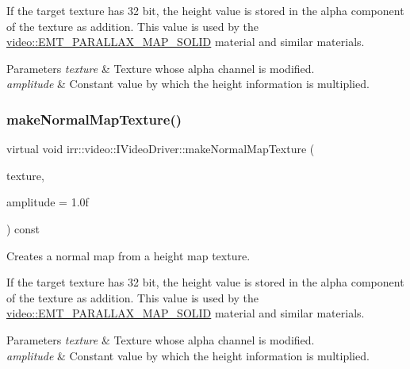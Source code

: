 If the target texture has 32 bit, the height value is stored in the alpha component of the texture as addition. This value is used by the \hyperlink{namespaceirr_1_1video_ac8e9b6c66f7cebabd1a6d30cbc5430f1a934021cc4ff72a7ac1a66f392b9abb82}{video\+::\+E\+M\+T\+\_\+\+P\+A\+R\+A\+L\+L\+A\+X\+\_\+\+M\+A\+P\+\_\+\+S\+O\+L\+ID} material and similar materials. 
\begin{DoxyParams}{Parameters}
{\em texture} & Texture whose alpha channel is modified. \\
\hline
{\em amplitude} & Constant value by which the height information is multiplied. \\
\hline
\end{DoxyParams}
\mbox{\label{classirr_1_1video_1_1IVideoDriver_a6470e31c1aaf2c0fa5e5a5b3f8f092e0}} 
\subsubsection{\texorpdfstring{make\+Normal\+Map\+Texture()}{makeNormalMapTexture()}\hspace{0.1cm}{\footnotesize\ttfamily [2/2]}}
{\footnotesize\ttfamily virtual void irr\+::video\+::\+I\+Video\+Driver\+::make\+Normal\+Map\+Texture (\begin{DoxyParamCaption}\item[{\hyperlink{classirr_1_1video_1_1ITexture}{video\+::\+I\+Texture} $\ast$}]{texture,  }\item[{\hyperlink{namespaceirr_a0277be98d67dc26ff93b1a6a1d086b07}{f32}}]{amplitude = {\ttfamily 1.0f} }\end{DoxyParamCaption}) const\hspace{0.3cm}{\ttfamily [pure virtual]}}



Creates a normal map from a height map texture. 

If the target texture has 32 bit, the height value is stored in the alpha component of the texture as addition. This value is used by the \hyperlink{namespaceirr_1_1video_ac8e9b6c66f7cebabd1a6d30cbc5430f1a934021cc4ff72a7ac1a66f392b9abb82}{video\+::\+E\+M\+T\+\_\+\+P\+A\+R\+A\+L\+L\+A\+X\+\_\+\+M\+A\+P\+\_\+\+S\+O\+L\+ID} material and similar materials. 
\begin{DoxyParams}{Parameters}
{\em texture} & Texture whose alpha channel is modified. \\
\hline
{\em amplitude} & Constant value by which the height information is multiplied. \\
\hline
\end{DoxyParams}
\mbox{\label{classirr_1_1video_1_1IVideoDriver_a1a236e1233fc6fc2c5f36aaa830814fc}} 
